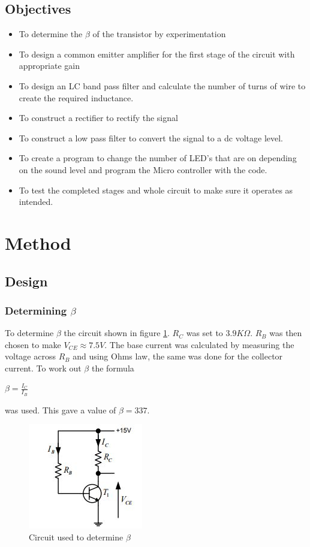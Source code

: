 \documentclass[10pt,a4paper]{article}
\begin{document}
\subsection{Objectives}
\begin{itemize}
  \item To determine the $\beta$ of the transistor by experimentation
  \item To design a common emitter amplifier for the first stage of the circuit with appropriate gain
  \item To design an LC band pass filter and calculate the number of turns of wire to create the required inductance.
  \item To construct a rectifier to rectify the signal
  \item To construct a low pass filter to convert the signal to a dc voltage level.
  \item To create a program to change the number of LED's that are on depending on the sound level and program the Micro controller with the code.
  \item To test the completed stages and whole circuit to make sure it operates as intended.  

  \end{itemize}

\section{Method}

\subsection{Design}
\subsubsection{Determining $\beta$}
To determine $\beta$ the circuit shown in figure \ref{Beta}. $R_C$ was set to $3.9K\Omega$. $R_B$ was then chosen to make $V_{CE}\approx 7.5V$. The base current was calculated by measuring the voltage across $R_B$ and using Ohms law, the same was done for the collector current. To work out $\beta$ the formula
\begin{center}
\Huge
$\beta = \frac{I_C}{I_B}$
\end{center}
was used. This gave a value of $\beta = 337$.

\begin{figure}[!h]
\includegraphics[scale=0.7]{beta}
\caption{Circuit used to determine $\beta$}
\label{Beta}
\end{figure}
\newpage
\end{document}
